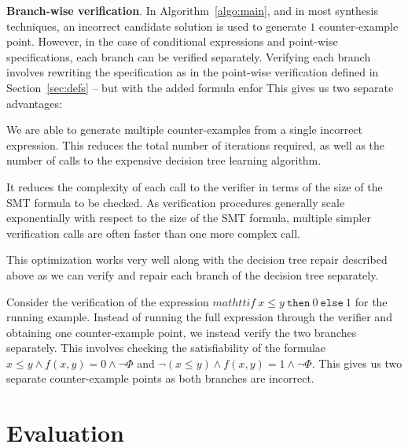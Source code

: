 \documentclass{llncs}
\newcommand\Spec{\Phi}
\renewcommand{\paragraph}[1]{\par\noindent\textbf{#1}.}
\begin{document}
\paragraph{Branch-wise verification}
In Algorithm~\ref{algo:main}, and in most synthesis techniques, an
incorrect candidate solution is used to generate $1$ counter-example
point.
However, in the case of conditional expressions and point-wise
specifications, each branch can be verified separately.
Verifying each branch involves rewriting the specification as in the
point-wise verification defined in Section~\ref{sec:defs} -- but with the
added formula enfor
This gives us two separate advantages:
\begin{compactitem}
\item We are able to generate multiple counter-examples from a single
  incorrect expression.
  This reduces the total number of iterations required, as well as the
  number of calls to the expensive decision tree learning algorithm.
\item It reduces the complexity of each call to the verifier in terms of
  the size of the SMT formula to be checked.
  As verification procedures generally scale exponentially with respect
  to the size of the SMT formula, multiple simpler verification calls
  are often faster than one more complex call.
\end{compactitem}
This optimization works very well along with the decision tree repair
described above as we can verify and repair each branch of the decision
tree separately.

\begin{example}
  Consider the verification of the expression $mathtt{if}~x \leq
  y~\mathtt{then}~0~\mathtt{else}~1$ for the running example.
  Instead of running the full expression through the verifier and
  obtaining one counter-example point, we instead verify the two
  branches separately.
  This involves checking the satisfiability of the formulae $x \leq y
  \wedge f(x, y) = 0 \wedge \neg \Spec$ and $\neg (x \leq y) \wedge f(x,
  y) = 1 \wedge \neg \Spec$.
  This gives us two separate counter-example points as both branches are
  incorrect.
\end{example}


\section{Evaluation}
\label{sec:evaluation}
% 


\end{document}
